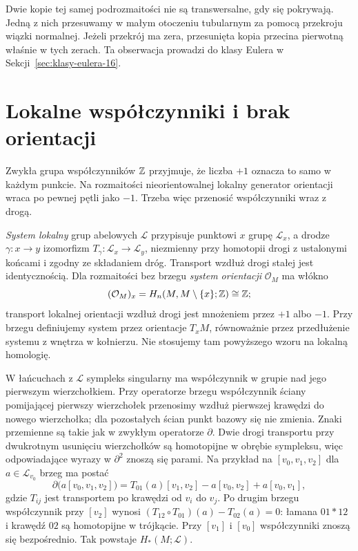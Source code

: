 \begin{uwaga}[Samoprzecięcie]
Dwie kopie tej samej
podrozmaitości nie są
transwersalne, gdy się
pokrywają. Jedną z nich
przesuwamy w małym
otoczeniu tubularnym
za pomocą przekroju
wiązki normalnej.
Jeżeli przekrój ma zera,
przesunięta kopia
przecina pierwotną
właśnie w tych zerach.
Ta obserwacja prowadzi
do klasy Eulera
w Sekcji~\ref{sec:klasy-eulera-16}.
\end{uwaga}

\section{Lokalne współczynniki i brak orientacji}
\label{sec:lokalne-wsp-16}

Zwykła grupa współczynników
$\mathbb{Z}$ przyjmuje, że liczba
$+1$ oznacza to samo w
każdym punkcie. Na rozmaitości
nieorientowalnej lokalny
generator orientacji wraca
po pewnej pętli jako $-1$.
Trzeba więc przenosić
współczynniki wraz z drogą.

\begin{definicja}
\label{def:system-lokalny-16}
\emph{System lokalny} grup abelowych
$\mathcal L$ przypisuje punktowi
$x$ grupę $\mathcal L_x$,
a drodze $\gamma:x\to y$
izomorfizm
$T_\gamma:\mathcal L_x\to\mathcal L_y$,
niezmienny przy homotopii
drogi z ustalonymi końcami
i zgodny ze składaniem dróg.
Transport wzdłuż drogi stałej jest identycznością.
Dla rozmaitości bez brzegu \emph{system orientacji}
$\mathcal O_M$ ma włókno
\[
 (\mathcal O_M)_x
  =H_n(M,M\setminus\{x\};\mathbb{Z})
  \cong\mathbb{Z};
\]
transport lokalnej orientacji
wzdłuż drogi jest mnożeniem
przez $+1$ albo $-1$. Przy brzegu definiujemy
system przez orientacje $T_xM$, równoważnie przez
przedłużenie systemu z wnętrza w kołnierzu.
Nie stosujemy tam powyższego wzoru na lokalną homologię.
\end{definicja}

W łańcuchach z $\mathcal L$
sympleks singularny ma
współczynnik w grupie
nad jego pierwszym
wierzchołkiem. Przy operatorze
brzegu współczynnik ściany
pomijającej pierwszy
wierzchołek przenosimy
wzdłuż pierwszej krawędzi
do nowego wierzchołka;
dla pozostałych ścian
punkt bazowy się nie
zmienia. Znaki przemienne
są takie jak w zwykłym
operatorze $\partial$.
Dwie drogi transportu
przy dwukrotnym usunięciu
wierzchołków są homotopijne
w obrębie sympleksu,
więc odpowiadające
wyrazy w $\partial^2$
znoszą się parami.
Na przykład na $[v_0,v_1,v_2]$ dla $a\in\mathcal L_{v_0}$
brzeg ma postać
\[
 \partial\bigl(a[v_0,v_1,v_2]\bigr)
 =T_{01}(a)[v_1,v_2]-a[v_0,v_2]+a[v_0,v_1],
\]
gdzie $T_{ij}$ jest transportem po krawędzi od $v_i$ do $v_j$.
Po drugim brzegu współczynnik przy $[v_2]$ wynosi
$(T_{12}\circ T_{01})(a)-T_{02}(a)=0$:
łamana $01*12$ i krawędź $02$ są homotopijne w trójkącie.
Przy $[v_1]$ i $[v_0]$ współczynniki znoszą się bezpośrednio.
Tak powstaje
$H_*(M;\mathcal L)$.

